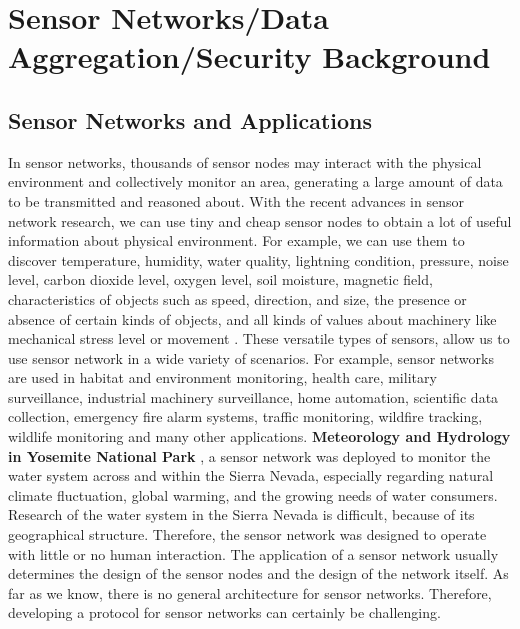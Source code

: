 \chapter{Sensor Networks/Data Aggregation/Security Background} 
\label{cha:Sensor Networks/Data Aggregation/Security Background}

\section{Sensor Networks and Applications}
	In sensor networks, thousands of sensor nodes may interact with the physical environment and collectively monitor an area, generating a large amount of data to be transmitted and reasoned about.
	With the recent advances in sensor network research, we can use tiny and cheap sensor nodes to obtain a lot of useful information about physical environment.
	For example, we can use them to discover temperature, humidity, water quality, lightning condition, pressure, noise level, carbon dioxide level, oxygen level, soil moisture, magnetic field, characteristics of objects such as speed, direction, and size, the presence or absence of certain kinds of objects, and all kinds of values about machinery like mechanical stress level or movement \cite{hof2007applications}.
	These versatile types of sensors, allow us to use sensor network in a wide variety of scenarios.
	For example, sensor networks are used in habitat and environment monitoring, health care, military surveillance, industrial machinery surveillance, home automation, scientific data collection, emergency fire alarm systems, traffic monitoring, wildfire tracking, wildlife monitoring and many other applications.
	\textbf{Meteorology and Hydrology in Yosemite National Park} \cite{lundquist2003meteorology}, a sensor network was deployed to monitor the water system across and within the Sierra Nevada, especially regarding natural climate fluctuation, global warming, and the growing needs of water consumers.
	Research of the water system in the Sierra Nevada is difficult, because of its geographical structure. 
	Therefore, the sensor network was designed to operate with little or no human interaction.
	The application of a sensor network usually determines the design of the sensor nodes and the design of the network itself.
	As far as we know, there is no general architecture for sensor networks.
	Therefore, developing a protocol for sensor networks can certainly be challenging. 

